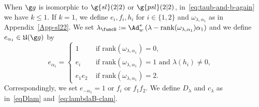 \documentclass[12pt]{amsart}
\begin{document}
\begin{rmk}
\label{rmk-lamBcsl22}
When $\g g$ is isomorphic to $\g{sl}(2|2)$ or $\g{psl}(2|2)$, 
in~\eqref{eq:taub-and-b-again} we have $k\leq 1$. 
 If $k=1$, we define $e_i,f_i,h_i$ for $i\in\{1,2\}$ and $\omega_{\lambda,\alpha_1}$ as in Appendix~\ref{App-sl22}. We set $\lambda_\funcB:=\Ad_w^*\left(\lambda-\mathrm{rank}(\omega_{\lambda,\alpha_1})\alpha_1\right)$ and we define $e_{\alpha_1}\in \mathfrak U(\g g)$ by 
 \[
e_{\alpha_1}=\begin{cases}
1 & \text{ if }\mathrm{rank}(\omega_{\lambda,\alpha_1})=0,\\
e_i & \text{ if }\mathrm{rank}(\omega_{\lambda,\alpha_1})=1\text{ and }\lambda(h_i)\neq 0,\\
e_1e_2& \text{ if }\mathrm{rank}(\omega_{\lambda,\alpha_1})=2.
\end{cases}
 \] 
Correspondingly, we set $e_{-\alpha_1}=1$ or $f_i$ or $f_1f_2$. We define $D_\lambda$ and $c_\lambda$ as in~\eqref{eqDlam} and~\eqref{eq:lambdaB-clam}.  \end{rmk}
\end{document}
